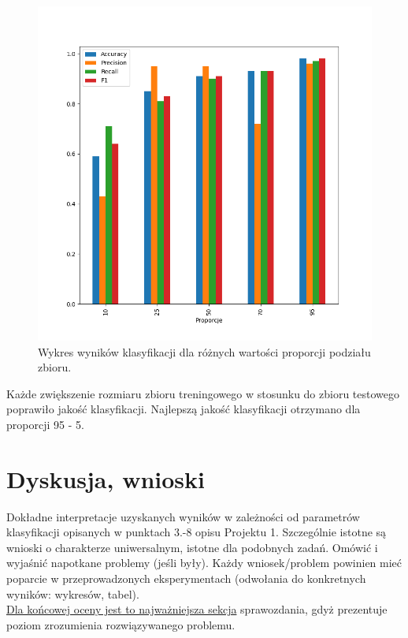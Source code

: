 \documentclass{classrep}
\begin{document}
\newpage

\begin{figure}[h!]
 \centering
 \includegraphics[width=15cm]{wykres_proporcje.png}
 \vspace{-0.3cm}
 \caption{Wykres wyników klasyfikacji dla różnych wartości proporcji podziału zbioru.}
 \label{wykres4}
\end{figure}


Każde zwiększenie rozmiaru zbioru treningowego w stosunku do zbioru testowego poprawiło jakość klasyfikacji. Najlepszą jakość klasyfikacji otrzymano dla proporcji 95 - 5.\\


\section{Dyskusja, wnioski}

Dokładne interpretacje uzyskanych wyników w zależności od parametrów klasyfikacji
opisanych w punktach 3.-8 opisu Projektu 1. 
Szczególnie istotne są wnioski o charakterze uniwersalnym, istotne dla podobnych zadań. 
Omówić i wyjaśnić napotkane problemy (jeśli były). Każdy wniosek/problem powinien mieć poparcie
w przeprowadzonych eksperymentach (odwołania do konkretnych wyników: wykresów,
tabel). \\
\underline{Dla końcowej oceny jest to najważniejsza sekcja} sprawozdania, gdyż prezentuje poziom
zrozumienia rozwiązywanego problemu.\\
\end{document}

